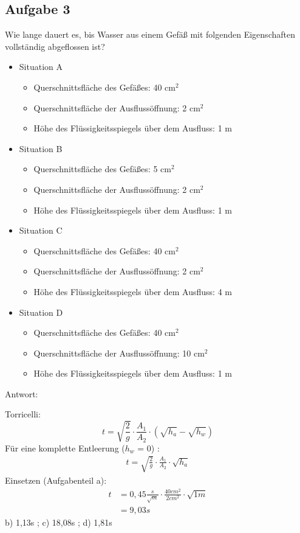 \documentclass[a4paper,10pt]{article}
\newcommand{\answ}{{\color{miugray2}Antwort: \par \vspace*{-3mm} 
\hrulefill }\par }
\begin{document}
\pagebreak
\subsection*{Aufgabe 3}
Wie lange dauert es, bis Wasser aus einem Gefäß mit folgenden Eigenschaften vollständig abgeflossen ist?

\begin{itemize}
\item Situation A
\begin{itemize}
    \item  Querschnittsfläche des Gefäßes: 40 cm$^2$
    \item  Querschnittsfläche der Ausflussöffnung: 2 cm$^2$
    \item  Höhe des Flüssigkeitsspiegels über dem Ausfluss: 1 m
\end{itemize}
\item Situation B
\begin{itemize}
    \item  Querschnittsfläche des Gefäßes: 5 cm$^2$
    \item  Querschnittsfläche der Ausflussöffnung: 2 cm$^2$
    \item  Höhe des Flüssigkeitsspiegels über dem Ausfluss: 1 m
\end{itemize}
\item Situation C
\begin{itemize}
    \item  Querschnittsfläche des Gefäßes: 40 cm$^2$
    \item  Querschnittsfläche der Ausflussöffnung: 2 cm$^2$
    \item  Höhe des Flüssigkeitsspiegels über dem Ausfluss: 4 m
\end{itemize}
\item Situation D
\begin{itemize}
    \item  Querschnittsfläche des Gefäßes: 40 cm$^2$
    \item  Querschnittsfläche der Ausflussöffnung: 10 cm$^2$
    \item  Höhe des Flüssigkeitsspiegels über dem Ausfluss: 1 m
\end{itemize}
\end{itemize}

\ppbig
\answ

Torricelli:
\begin{equation}
t = \sqrt{\frac{2}{g}} \cdot \frac{A_1}{A_2} \cdot (\sqrt{h_a} - \sqrt{h_w})
\end{equation}
Für eine komplette Entleerung ($h_w$ = 0) :
\begin{align*}
t = \sqrt{\frac{2}{g}} \cdot \frac{A_1}{A_2} \cdot \sqrt{h_a}
\end{align*}
Einsetzen (Aufgabenteil a):
\begin{align*}
t &= 0,45 \frac{s}{\sqrt{m}}\cdot \frac{40cm^2}{2cm^2} \cdot \sqrt{1m} \\
 &= 9,03s 
\end{align*}
b) 1,13s ; c) 18,08s ; d) 1,81s \par 
\end{document}
